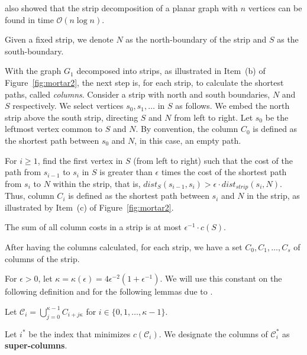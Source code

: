\citeauthor{klein2006} also showed that the strip decomposition of a planar graph with \(n\) vertices can be found in time \(\mathcal{O}(n \log n)\).

Given a fixed strip, we denote \(N\) as the north-boundary of the strip and \(S\) as the south-boundary.

With the graph \(G_1\) decomposed into strips, as illustrated in Item~(b) of Figure~\ref{fig:mortar2}, the next step is, for each strip, to calculate the shortest paths, called \textit{columns}. Consider a strip with north and south boundaries, \(N\) and \(S\) respectively. We select vertices \(s_0, s_1, \dots\) in \(S\) as follows. We embed the north strip above the south strip, directing \(S\) and \(N\) from left to right. Let \(s_0\) be the leftmost vertex common to \(S\) and \(N\). By convention, the column \(C_0\) is defined as the shortest path between \(s_0\) and \(N\), in this case, an empty path.

For \(i \geq 1\), find the first vertex in \(S\) (from left to right) such that the cost of the path from \(s_{i-1}\) to \(s_i\) in \(S\) is greater than \(\epsilon\) times the cost of the shortest path from \(s_i\) to \(N\) within the strip, that is, \(dist_S(s_{i-1}, s_i) > \epsilon \cdot dist_{strip}(s_i, N)\). Thus, column \(C_i\) is defined as the shortest path between \(s_i\) and \(N\) in the strip, as illustrated by Item~(c) of Figure~\ref{fig:mortar2}.

\begin{flemma}
The sum of all column costs in a strip is at most \(\epsilon^{-1} \cdot c(S)\).
\end{flemma}

After having the columns calculated, for each strip, we have a set \(C_0, C_1, \dots, C_s\) of columns of the strip.

For \(\epsilon > 0\), let \(\kappa = \kappa(\epsilon) = 4 \epsilon ^ {-2} (1 + \epsilon ^ {-1})\). We will use this constant on the following definition and for the following lemmas due to \cite{Borradaile2009b}.

Let \(\mathcal{C}_i = \bigcup_{j=0}^{\kappa-1} C_{i+j\kappa}\) for \(i \in \{0, 1, \dots, \kappa - 1\}\).

Let \(i^\ast\) be the index that minimizes \(c(\mathcal{C}_i)\). We designate the columns of \(\mathcal{C}_i^\ast\) as \textbf{super-columns}.

